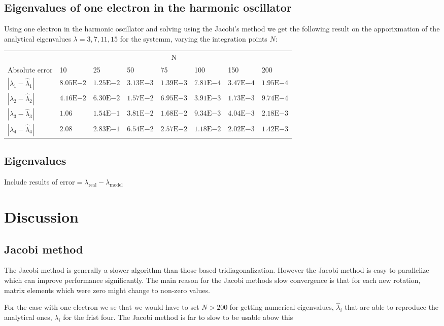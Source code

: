 \documentclass[a4paper, fontsize=11pt]{article}
\begin{document}
\subsection{Eigenvalues of one electron in the harmonic oscillator}

Using one electron in the harmonic oscillator and solving using the Jacobi's method we get the following result on the apporixmation of the analytical eigenvalues $\lambda = 3, 7, 11, 15$ for the systemm, varying the integration points $N$:

\begin{center}
\begin{tabular}{@{}llllllll@{}}
\toprule
     & \multicolumn{7}{c}{N}               \\ \cmidrule(l){2-8} 
Absolute error & 10 & 25 & 50 & 75 & 100 & 150 & 200 \\ \midrule
$|\lambda_1 - \hat{\lambda}_1|$    &    $8.05\mathrm{E}{-2}$&    $1.25\mathrm{E}{-2}$&    $3.13\mathrm{E}{-3}$&    $1.39\mathrm{E}{-3}$&     $7.81\mathrm{E}{-4}$&     $3.47\mathrm{E}{-4}$&      $1.95\mathrm{E}{-4}$\\
$|\lambda_2 - \hat{\lambda}_2|$    &    $4.16\mathrm{E}{-2}$&    $6.30\mathrm{E}{-2}$&    $1.57\mathrm{E}{-2}$&    $6.95\mathrm{E}{-3}$&     $3.91\mathrm{E}{-3}$&     $1.73\mathrm{E}{-3}$&      $9.74\mathrm{E}{-4}$\\
$|\lambda_3 - \hat{\lambda}_3|$    &    $1.06$&    $1.54\mathrm{E}{-1}$&    $3.81\mathrm{E}{-2}$&    $1.68\mathrm{E}{-2}$&     $9.34\mathrm{E}{-3}$&     $4.04\mathrm{E}{-3}$&     $2.18\mathrm{E}{-3}$\\
$|\lambda_4 - \hat{\lambda}_4|$    &    $2.08$&    $2.83\mathrm{E}{-1}$&    $6.54\mathrm{E}{-2}$&    $2.57\mathrm{E}{-2}$&     $1.18\mathrm{E}{-2}$&     $2.02\mathrm{E}{-3}$&     $1.42\mathrm{E}{-3}$\\ \bottomrule
\end{tabular}
\end{center}

\subsection{Eigenvalues}

Include results of $\text{error}=\lambda_{\text{real}} - \lambda_{\text{model}}$

\section{Discussion}
\subsection{Jacobi method}
The Jacobi method is generally a slower algorithm than those based tridiagonalization. However the Jacobi method is easy to parallelize which can improve performance significantly. The main reason for the Jacobi methods slow convergence is that for each new rotation, matrix elements which were zero might change to non-zero values.

For the case with one electron we se that we would have to set $N > 200$ for getting numerical eigenvalues, $\hat{\lambda}_i$ that are able to reproduce the analytical ones, $\lambda_i$ for the frist four. The Jacobi method is far to slow to be usable abow this 



\end{document}
